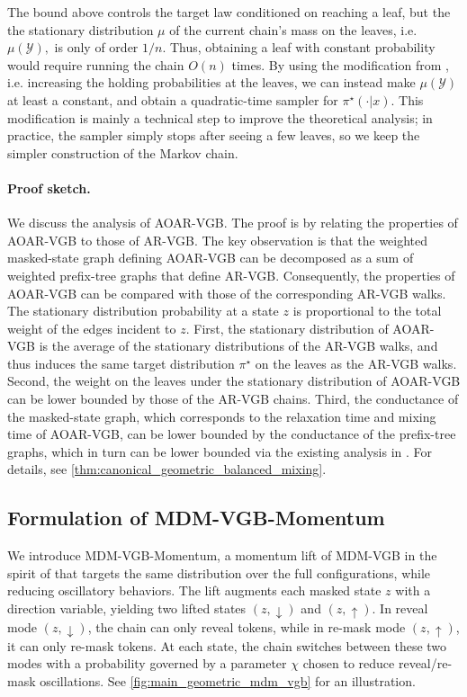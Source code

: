 \documentclass{article}
\numberwithin{theorem}{section}
\numberwithin{proposition}{section}
\numberwithin{corollary}{section}
\numberwithin{lemma}{section}
\numberwithin{conjecture}{section}
\numberwithin{remark}{section}
\numberwithin{definition}{section}
\numberwithin{assumption}{section}
\numberwithin{example}{section}
\newcommand{\calY}{{\mathcal{Y}}}
\begin{document}
\vspace{-5pt}
\begin{remark}%
    The bound above controls the target law conditioned on reaching a leaf, but the the stationary distribution $\mu$ of the current chain's mass on the leaves, i.e. $\mu(\calY),$  is only of order \(1/n\). Thus, obtaining a leaf with constant probability would require running the chain \(O(n)\) times. By using the modification from \cite{hayes2010liftings,rohatgi2025taming}, i.e. increasing the holding probabilities at the leaves, we can instead make $\mu(\calY)$ at least a constant, and obtain a quadratic-time sampler for $\pi^\star(\cdot|x)$. This modification is mainly a technical step to improve the theoretical analysis; in practice, the sampler simply stops after seeing a few leaves, so we keep the simpler construction of the Markov chain.
\end{remark}

\paragraph{Proof sketch.} We discuss the analysis of AOAR-VGB. The proof is by relating the properties of AOAR-VGB to those of AR-VGB.
The key observation is that the weighted masked-state graph defining AOAR-VGB can be decomposed as a sum of weighted prefix-tree graphs that define AR-VGB. Consequently, the properties of AOAR-VGB can be compared with those of the corresponding AR-VGB walks. The stationary distribution probability at a state $z$ is proportional to the total weight of the edges incident to $z.$ First, the stationary distribution of AOAR-VGB is the average of the stationary distributions of the AR-VGB walks, and thus induces the same target distribution $\pi^\star$ on the leaves as the AR-VGB walks. Second, the weight on the leaves under the stationary distribution of AOAR-VGB can be lower bounded by those of the AR-VGB chains. Third, the conductance of the masked-state graph, which corresponds to the relaxation time and mixing time of AOAR-VGB, can be lower bounded by the conductance of the prefix-tree graphs, which in turn can be lower bounded via the existing analysis in \cite{sinclair1989approximate,rohatgi2025taming}. For details, see \cref{thm:canonical_geometric_balanced_mixing}.

\subsection{Formulation of MDM-VGB-Momentum}
We introduce MDM-VGB-Momentum, a
momentum lift of MDM-VGB in the spirit of \cite{hayes2010liftings} that targets the same distribution over the full configurations, while reducing oscillatory behaviors. The lift augments each masked state \(z\) with a direction variable, yielding
two lifted states \((z,\downarrow)\) and \((z,\uparrow)\). In reveal mode
\((z,\downarrow)\), the chain can only reveal tokens, while in re-mask mode
\((z,\uparrow)\), it can only re-mask tokens. At each state, the chain switches between these
two modes with a probability governed
by a parameter \(\chi\) chosen to reduce reveal/re-mask oscillations. See \cref{fig:main_geometric_mdm_vgb} for an illustration.
\end{document}
